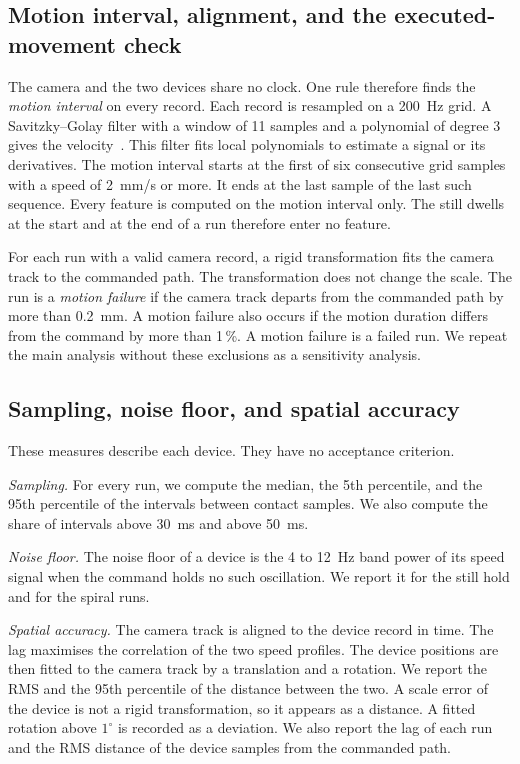 \subsection{Motion interval, alignment, and the executed-movement check}
\label{sec:interval}
The camera and the two devices share no clock.
One rule therefore finds the \emph{motion interval} on every record.
Each record is resampled on a 200~Hz grid.
A Savitzky--Golay filter with a window of 11 samples and a polynomial of degree 3 gives the velocity~\cite{Savitzky1964}.
This filter fits local polynomials to estimate a signal or its derivatives.
The motion interval starts at the first of six consecutive grid samples with a speed of 2~mm/s or more.
It ends at the last sample of the last such sequence.
Every feature is computed on the motion interval only.
The still dwells at the start and at the end of a run therefore enter no feature.

For each run with a valid camera record, a rigid transformation fits the camera track to the commanded path.
The transformation does not change the scale.
The run is a \emph{motion failure} if the camera track departs from the commanded path by more than 0.2~mm.
A motion failure also occurs if the motion duration differs from the command by more than 1\,\%.
A motion failure is a failed run.
We repeat the main analysis without these exclusions as a sensitivity analysis.

\subsection{Sampling, noise floor, and spatial accuracy}
\label{sec:sampling}
These measures describe each device.
They have no acceptance criterion.

\emph{Sampling.}
For every run, we compute the median, the 5th percentile, and the 95th percentile of the intervals between contact samples.
We also compute the share of intervals above 30~ms and above 50~ms.

\emph{Noise floor.}
The noise floor of a device is the 4 to 12~Hz band power of its speed signal when the command holds no such oscillation.
We report it for the still hold and for the spiral runs.

\emph{Spatial accuracy.}
The camera track is aligned to the device record in time.
The lag maximises the correlation of the two speed profiles.
The device positions are then fitted to the camera track by a translation and a rotation.
We report the RMS and the 95th percentile of the distance between the two.
A scale error of the device is not a rigid transformation, so it appears as a distance.
A fitted rotation above $1^\circ$ is recorded as a deviation.
We also report the lag of each run and the RMS distance of the device samples from the commanded path.

